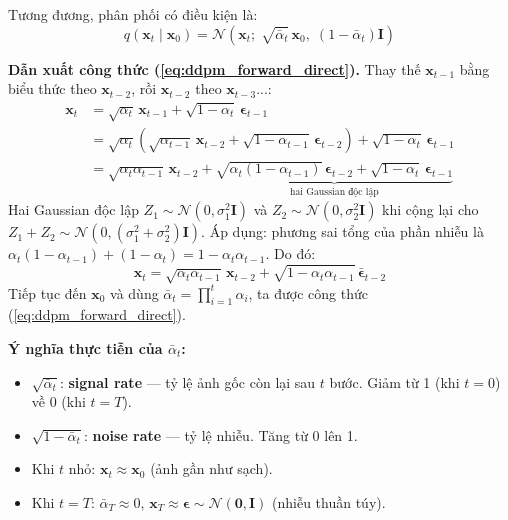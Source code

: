 Tương đương, phân phối có điều kiện là:
\begin{equation}
    q(\mathbf{x}_t \mid \mathbf{x}_0) = \mathcal{N}\!\left(\mathbf{x}_t;\; \sqrt{\bar{\alpha}_t}\,\mathbf{x}_0,\; (1-\bar{\alpha}_t)\mathbf{I}\right)
\end{equation}

\textbf{Dẫn xuất công thức (\ref{eq:ddpm_forward_direct}).}
Thay thế $\mathbf{x}_{t-1}$ bằng biểu thức theo $\mathbf{x}_{t-2}$, rồi $\mathbf{x}_{t-2}$ theo $\mathbf{x}_{t-3}$...:
\begin{align*}
\mathbf{x}_t &= \sqrt{\alpha_t}\,\mathbf{x}_{t-1} + \sqrt{1-\alpha_t}\,\boldsymbol{\epsilon}_{t-1} \\
&= \sqrt{\alpha_t}\!\left(\sqrt{\alpha_{t-1}}\,\mathbf{x}_{t-2} + \sqrt{1-\alpha_{t-1}}\,\boldsymbol{\epsilon}_{t-2}\right) + \sqrt{1-\alpha_t}\,\boldsymbol{\epsilon}_{t-1} \\
&= \sqrt{\alpha_t\alpha_{t-1}}\,\mathbf{x}_{t-2} + \underbrace{\sqrt{\alpha_t(1-\alpha_{t-1})}\,\boldsymbol{\epsilon}_{t-2} + \sqrt{1-\alpha_t}\,\boldsymbol{\epsilon}_{t-1}}_{\text{hai Gaussian độc lập}}
\end{align*}
Hai Gaussian độc lập $Z_1 \sim \mathcal{N}(0,\sigma_1^2\mathbf{I})$ và $Z_2 \sim \mathcal{N}(0,\sigma_2^2\mathbf{I})$ khi cộng lại cho $Z_1+Z_2 \sim \mathcal{N}(0,(\sigma_1^2+\sigma_2^2)\mathbf{I})$. Áp dụng: phương sai tổng của phần nhiễu là $\alpha_t(1-\alpha_{t-1}) + (1-\alpha_t) = 1 - \alpha_t\alpha_{t-1}$. Do đó:
\[
    \mathbf{x}_t = \sqrt{\alpha_t\alpha_{t-1}}\,\mathbf{x}_{t-2} + \sqrt{1-\alpha_t\alpha_{t-1}}\,\bar{\boldsymbol{\epsilon}}_{t-2}
\]
Tiếp tục đến $\mathbf{x}_0$ và dùng $\bar{\alpha}_t = \prod_{i=1}^t \alpha_i$, ta được công thức (\ref{eq:ddpm_forward_direct}).

\textbf{Ý nghĩa thực tiễn của $\bar{\alpha}_t$:}
\begin{itemize}
    \item $\sqrt{\bar{\alpha}_t}$: \textbf{signal rate} --- tỷ lệ ảnh gốc còn lại sau $t$ bước. Giảm từ 1 (khi $t=0$) về 0 (khi $t=T$).
    \item $\sqrt{1-\bar{\alpha}_t}$: \textbf{noise rate} --- tỷ lệ nhiễu. Tăng từ 0 lên 1.
    \item Khi $t$ nhỏ: $\mathbf{x}_t \approx \mathbf{x}_0$ (ảnh gần như sạch).
    \item Khi $t = T$: $\bar{\alpha}_T \approx 0$, $\mathbf{x}_T \approx \boldsymbol{\epsilon} \sim \mathcal{N}(\mathbf{0},\mathbf{I})$ (nhiễu thuần túy).
\end{itemize}


